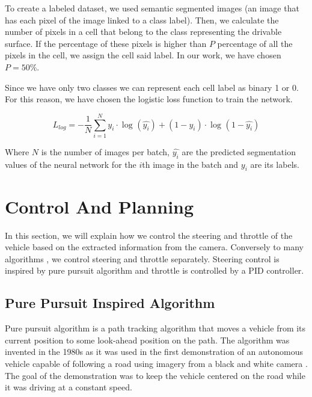 \documentclass{ctuthesis/ctuthesis}
\begin{document}
To create a labeled dataset, we used semantic segmented images (an image that has each pixel of the image linked to a class label). Then, we calculate the number of pixels in a cell that belong to the class representing the drivable surface. If the percentage of these pixels is higher than $P$ percentage of all the pixels in the cell, we assign the cell said label. In our work, we have chosen $P=50\%$.\par


Since we have only two classes we can represent each cell label as binary 1 or 0. For this reason, we have chosen the logistic loss function to train the network. \par

\begin{equation}
L_{log} = -\dfrac{1}{N} \sum_{i=1}^{N} y_i \cdot \log_{} (\hat{y_i}) + (1 - y_i) \cdot \log_{} (1-\hat{y_i})
\end{equation}

Where $N$ is the number of images per batch, $\hat{y_i}$ are the predicted segmentation values of the neural network for the $i$th image in the batch and $y_i$ are its labels. 




\section{Control And Planning}
In this section, we will explain how we control the steering and throttle of the vehicle based on the extracted information from the camera. Conversely to many algorithms \cite{Broggi2013,Werling2010}, we control steering and throttle separately. Steering control is inspired by pure pursuit algorithm and throttle is controlled by a PID controller.


\subsection{Pure Pursuit Inspired Algorithm} \label{sec:pure_pursuit}
Pure pursuit algorithm is a path tracking algorithm that moves a vehicle from its current position to some look-ahead position on the path. The algorithm was invented in the 1980s as it was used in the first demonstration of an autonomous vehicle capable of following a road using imagery from a black and white camera \cite{pure_pursuit_orig}. The goal of the demonstration was to keep the vehicle centered on the road while it was driving at a constant speed.\par
\end{document}
